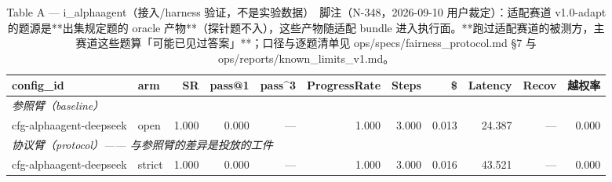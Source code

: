 \begin{table}[t]
\centering
\caption{Table A — i\_alphaagent（接入/harness 验证，不是实验数据）　脚注（N-348，2026-09-10 用户裁定）：适配赛道 v1.0-adapt 的题源是**出集规定题的 oracle 产物**（探针题不入），这些产物随适配 bundle 进入执行面。**跑过适配赛道的被测方，主赛道这些题算「可能已见过答案」**；口径与逐题清单见 ops/specs/fairness\_protocol.md §7 与 ops/reports/known\_limits\_v1.md。}
\label{tab:a-i_alphaagent}
\begin{tabular}{llrrrrrrrrr}
\toprule
config\_id & arm & SR & pass@1 & pass\^{}3 & ProgressRate & Steps & \$ & Latency & Recov & 越权率 \\
\midrule
\multicolumn{11}{l}{\textit{参照臂（baseline）}} \\
cfg-alphaagent-deepseek & open & 1.000 & 0.000 & --- & 1.000 & 3.000 & 0.013 & 24.387 & --- & 0.000 \\
\midrule
\multicolumn{11}{l}{\textit{协议臂（protocol）—— 与参照臂的差异是投放的工件}} \\
cfg-alphaagent-deepseek & strict & 1.000 & 0.000 & --- & 1.000 & 3.000 & 0.016 & 43.521 & --- & 0.000 \\
\bottomrule
\end{tabular}
\end{table}

